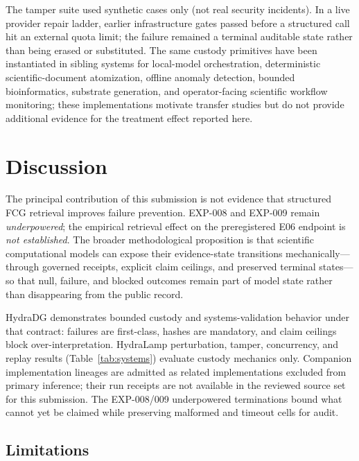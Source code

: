 \documentclass{article}
\begin{document}
The tamper suite used synthetic cases only (not real security incidents).
In a live provider repair ladder, earlier infrastructure gates passed before a structured call hit an external quota limit; the failure remained a terminal auditable state rather than being erased or substituted.
The same custody primitives have been instantiated in sibling systems for local-model orchestration, deterministic scientific-document atomization, offline anomaly detection, bounded bioinformatics, substrate generation, and operator-facing scientific workflow monitoring; these implementations motivate transfer studies but do not provide additional evidence for the treatment effect reported here.

\section{Discussion}

The principal contribution of this submission is not evidence that structured FCG retrieval improves failure prevention.
EXP-008 and EXP-009 remain \emph{underpowered}; the empirical retrieval effect on the preregistered E06 endpoint is \emph{not established}.
The broader methodological proposition is that scientific computational models can expose their evidence-state transitions mechanically---through governed receipts, explicit claim ceilings, and preserved terminal states---so that null, failure, and blocked outcomes remain part of model state rather than disappearing from the public record.

HydraDG demonstrates bounded custody and systems-validation behavior under that contract: failures are first-class, hashes are mandatory, and claim ceilings block over-interpretation.
HydraLamp perturbation, tamper, concurrency, and replay results (Table~\ref{tab:systems}) evaluate custody mechanics only.
Companion implementation lineages are admitted as related implementations excluded from primary inference; their run receipts are not available in the reviewed source set for this submission.
The EXP-008/009 underpowered terminations bound what cannot yet be claimed while preserving malformed and timeout cells for audit.

\subsection{Limitations}
\label{sec:limitations}
\end{document}
